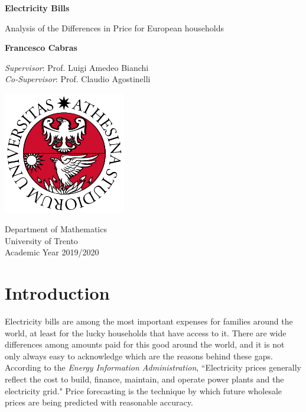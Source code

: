 \documentclass[a4paper,12pt]{book}
\begin{document}
\frontmatter
\begin{titlepage}
    \begin{center}
        \vspace*{1cm}

        \LARGE
        \textbf{Electricity Bills}

        \vspace{0.5cm}
        \large
        Analysis of the Differences in Price for European households

        \vspace{1.5cm}

        \textbf{Francesco Cabras}

        \vfill
        \textit{Supervisor}: Prof. Luigi Amedeo Bianchi\\
        \textit{Co-Supervisor}: Prof. Claudio Agostinelli

        \vspace{1.5cm}

        \includegraphics[width=0.4\textwidth]{Images/uni}

        Department of Mathematics\\
        University of Trento\\
        Academic Year 2019/2020

    \end{center}
\end{titlepage}
\thispagestyle{empty}


\tableofcontents

\mainmatter
\chapter{Introduction}

Electricity bills are among the most important expenses for families around the world, at least for the lucky households that have access to it. There are wide differences among amounts paid for this good around the world, and it is not only always easy to acknowledge which are the reasons behind these gaps. According to the \textit{Energy Information Administration}, ``Electricity prices generally reflect the cost to build, finance, maintain, and operate power plants and the electricity grid." Price forecasting is the technique by which future wholesale prices are being predicted with reasonable accuracy.~\cite{weron2014electricity}
\end{document}
